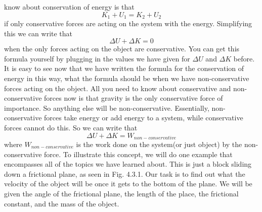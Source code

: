\documentclass{article}[gray]
\numberwithin{equation}{subsection}
\begin{document}
know about conservation of energy is that \begin{equation}K_1+U_1=K_2+U_2\end{equation} if only conservative forces are acting on the system with the energy. Simplifying this we can write that $$\Delta U+\Delta K=0$$ when the only forces acting on the object are conservative. You can get this formula yourself by plugging in the values we have given for $\Delta U$ and $\Delta K$ before. It is easy to see now that we have written the formula for the conservation of energy in this way, what the formula should be when we have non-conservative forces acting on the object. All you need to know about conservative and non-conservative forces now is that gravity is the only conservative force of importance. So anything else will be non-conservative. Essentially, non-conservative forces take energy or add energy to a system, while conservative forces cannot do this. So we can write that \begin{equation}\Delta U+\Delta K=W_{non-conservative}\end{equation} where $W_{non-conservative}$ is the work done on the system(or just object) by the non-conservative force. To illustrate this concept, we will do one example that encompasses all of the topics we have learned about. This is just a block sliding down a frictional plane, as seen in Fig. 4.3.1. Our task is to find out what the velocity of the object will be once it gets to the bottom of the plane. We will be given the angle of the frictional plane, the length of the place, the frictional constant, and the mass of the object. 
\end{document}
